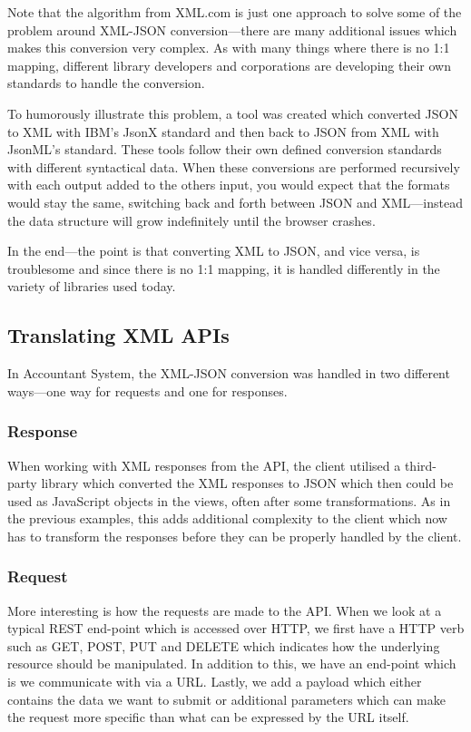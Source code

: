 \documentclass{cslthse-msc}
\begin{document}
Note that the algorithm from XML.com is just one approach to solve some of the problem around XML-JSON conversion---there are many additional issues which makes this conversion very complex. As with many things where there is no 1:1 mapping, different library developers and corporations are developing their own standards to handle the conversion.

To humorously illustrate this problem, a tool was created\cite{jsonx_jsonml} which converted JSON to XML with IBM's JsonX standard and then back to JSON from XML with JsonML's\cite{jsonml} standard. These tools follow their own defined conversion standards with different syntactical data. When these conversions are performed recursively with each output added to the others input, you would expect that the formats would stay the same, switching back and forth between JSON and XML---instead the data structure will grow indefinitely until the browser crashes.

In the end---the point is that converting XML to JSON, and vice versa, is troublesome and since there is no 1:1 mapping, it is handled differently in the variety of libraries used today.

\subsection{Translating XML APIs}
In Accountant System, the XML-JSON conversion was handled in two different ways---one way for requests and one for responses.

\subsubsection{Response}

When working with XML responses from the API, the client utilised a third-party library which converted the XML responses to JSON which then could be used as JavaScript objects in the views, often after some transformations. As in the previous examples, this adds additional complexity to the client which now has to transform the responses before they can be properly handled by the client.

\subsubsection{Request}
More interesting is how the requests are made to the API. When we look at a typical REST end-point which is accessed over HTTP, we first have a HTTP verb such as GET, POST, PUT and DELETE which indicates how the underlying resource should be manipulated. In addition to this, we have an end-point which is we communicate with via a URL. Lastly, we add a payload which either contains the data we want to submit or additional parameters which can make the request more specific than what can be expressed by the URL itself.
\end{document}

